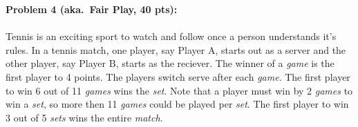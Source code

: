 \documentclass[12pt]{article}
\begin{document}
\vskip0.25in
\newpage
\noindent\textbf{Problem 4 (aka.\ Fair Play, 40 pts):}

\paragraph{} Tennis is an exciting sport to watch and follow once a person understands it's rules. In a tennis match, one player, say Player A, starts out as a server and the other player, say Player B, starts as the reciever. The winner of a \emph{game} is the first player to 4 points. The players switch serve after each \emph{game}. The first player to win 6 out of 11 \emph{games} wins the \emph{set}. Note that a player must win by 2 \emph{games} to win a \emph{set}, so more then 11 \emph{games} could be played per \emph{set}. The first player to win 3 out of 5 \emph{sets} wins the entire \emph{match}.
\end{document}
